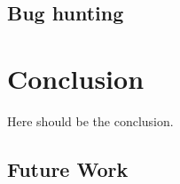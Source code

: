 \documentclass[draft]{llncs}
\begin{document}

\vspace*{-0mm}\subsection{Bug hunting}\vspace*{-0mm}


\vspace*{-0mm}\section{Conclusion}\vspace*{-0mm} \label{sec:conclusion}

Here should be the conclusion.

\vspace*{-0mm}\subsection{Future Work}\vspace*{-0mm}



% 
% 

%
\end{document}
